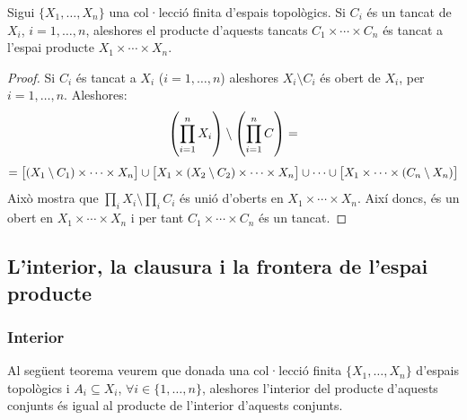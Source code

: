 \documentclass[../main.tex]{subfiles}
\begin{document}
\begin{prop}
\label{prop:productetancats} Sigui $\{X_1,\ldots,X_n\}$ una col·lecció finita d'espais topològics. Si $C_i$ és un tancat de $X_i$, $i=1,\ldots,n$, aleshores el producte d'aquests tancats $C_1\times\cdots\times C_n$ és tancat a l'espai producte $X_1\times \cdots\times X_n$.
\end{prop}
\begin{proof}
Si $C_i$ és tancat a $X_i$ ($i=1,\ldots,n$) aleshores $X_i\setminus C_i$ és obert de $X_i$, per $i=1,\ldots,n$. Aleshores:
\begin{equation}
    \notag
    \left(\prod_{i=1}^nX_i\right)\setminus\left(\prod_{i=1}^n C\right) = 
\end{equation}
\begin{equation}
    \notag
    =\left[(X_1\setminus C_1)\times \cdots\times X_n\right]\cup\left[X_1\times(X_2\setminus C_2)\times \cdots\times X_n\right]\cup\cdots\cup\left[X_1\times\cdots\times (C_n\setminus X_n)\right]
\end{equation}
Això mostra que $\prod_i X_i \setminus \prod_i C_i$ és unió d'oberts en $X_1\times\cdots\times X_n$. Així doncs, és un obert en $X_1\times \cdots\times X_n$ i per tant $C_1\times \cdots\times C_n$ és un tancat.
\end{proof}

\subsection{L'interior, la clausura i la frontera de l'espai producte}

\subsubsection{Interior}
Al següent teorema veurem que donada una col·lecció finita $\{X_1,\ldots,X_n\}$ d'espais topològics i $A_i\subseteq X_i$, $\forall i\in \{1,\ldots,n\}$, aleshores l'interior del producte d'aquests conjunts és igual al producte de l'interior d'aquests conjunts.
\end{document}
